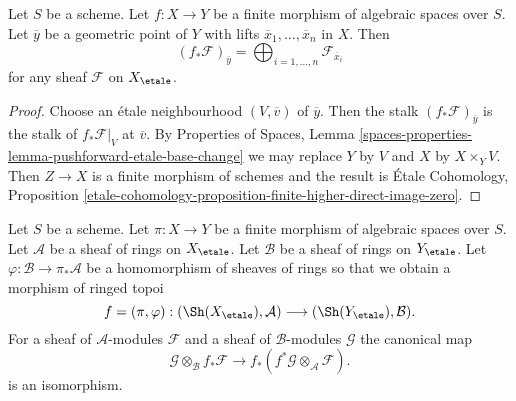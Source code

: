 \begin{lemma}
\label{lemma-stalk-push-finite}
Let $S$ be a scheme. Let $f : X \to Y$ be a finite morphism of algebraic
spaces over $S$. Let $\overline{y}$ be a geometric point of $Y$ with
lifts $\overline{x}_1, \ldots, \overline{x}_n$ in $X$. Then
$$
(f_*\mathcal{F})_{\overline{y}} =
\bigoplus\nolimits_{i = 1, \ldots, n}
\mathcal{F}_{\overline{x}_i}
$$
for any sheaf $\mathcal{F}$ on $X_\etale$.
\end{lemma}

\begin{proof}
Choose an \'etale neighbourhood $(V, \overline{v})$ of $\overline{y}$.
Then the stalk $(f_*\mathcal{F})_{\overline{y}}$
is the stalk of $f_*\mathcal{F}|_V$ at $\overline{v}$.
By Properties of Spaces,
Lemma \ref{spaces-properties-lemma-pushforward-etale-base-change}
we may replace $Y$ by $V$ and $X$ by $X \times_Y V$.
Then $Z \to X$ is a finite morphism of schemes and the result is
\'Etale Cohomology, Proposition
\ref{etale-cohomology-proposition-finite-higher-direct-image-zero}.
\end{proof}

\begin{lemma}
\label{lemma-finite-rings}
Let $S$ be a scheme. Let $\pi : X \to Y$ be a finite morphism of algebraic
spaces over $S$. Let $\mathcal{A}$ be a sheaf of rings on $X_\etale$.
Let $\mathcal{B}$ be a sheaf of rings on $Y_\etale$.
Let $\varphi : \mathcal{B} \to \pi_*\mathcal{A}$
be a homomorphism of sheaves of rings so that we obtain a
morphism of ringed topoi
$$
f = (\pi, \varphi) :
(\Sh(X_\etale), \mathcal{A})
\longrightarrow
(\Sh(Y_\etale), \mathcal{B}).
$$
For a sheaf of $\mathcal{A}$-modules $\mathcal{F}$ and a
sheaf of $\mathcal{B}$-modules $\mathcal{G}$ the canonical map
$$
\mathcal{G} \otimes_\mathcal{B} f_*\mathcal{F}
\longrightarrow
f_*(f^*\mathcal{G} \otimes_\mathcal{A} \mathcal{F}).
$$
is an isomorphism.
\end{lemma}

